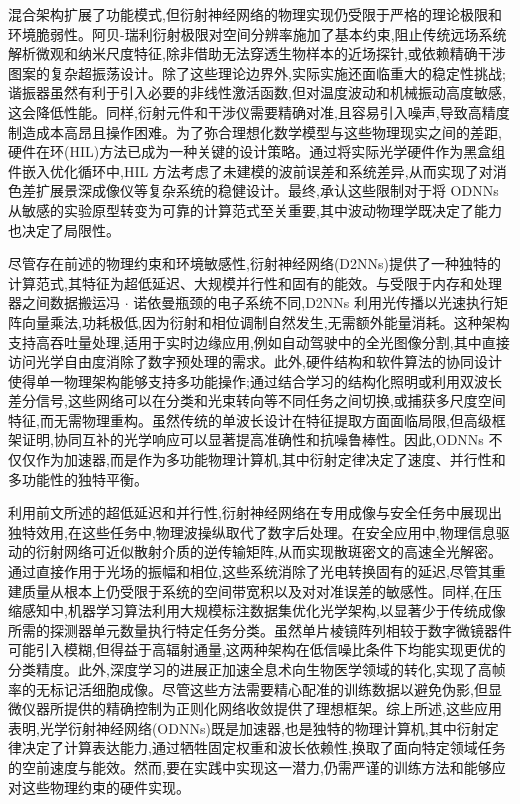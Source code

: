 \documentclass[11pt]{article}
\begin{document}
混合架构扩展了功能模式,但衍射神经网络的物理实现仍受限于严格的理论极限和环境脆弱性。阿贝-瑞利衍射极限对空间分辨率施加了基本约束,阻止传统远场系统解析微观和纳米尺度特征,除非借助无法穿透生物样本的近场探针,或依赖精确干涉图案的复杂超振荡设计。除了这些理论边界外,实际实施还面临重大的稳定性挑战;谐振器虽然有利于引入必要的非线性激活函数,但对温度波动和机械振动高度敏感,这会降低性能。同样,衍射元件和干涉仪需要精确对准,且容易引入噪声,导致高精度制造成本高昂且操作困难。为了弥合理想化数学模型与这些物理现实之间的差距,硬件在环(HIL)方法已成为一种关键的设计策略。通过将实际光学硬件作为黑盒组件嵌入优化循环中,HIL 方法考虑了未建模的波前误差和系统差异,从而实现了对消色差扩展景深成像仪等复杂系统的稳健设计。最终,承认这些限制对于将 ODNNs 从敏感的实验原型转变为可靠的计算范式至关重要,其中波动物理学既决定了能力也决定了局限性。\citep{doi_10_3390_nano14080697_c372a140} \citep{doi_10_1364_oe_461549_b2d41b3f} \citep{doi_10_1117_1_ap_6_5_056004_3f240d06}

尽管存在前述的物理约束和环境敏感性,衍射神经网络(D2NNs)提供了一种独特的计算范式,其特征为超低延迟、大规模并行性和固有的能效。与受限于内存和处理器之间数据搬运冯 \(\cdot\) 诺依曼瓶颈的电子系统不同,D2NNs 利用光传播以光速执行矩阵向量乘法,功耗极低,因为衍射和相位调制自然发生,无需额外能量消耗。这种架构支持高吞吐量处理,适用于实时边缘应用,例如自动驾驶中的全光图像分割,其中直接访问光学自由度消除了数字预处理的需求。此外,硬件结构和软件算法的协同设计使得单一物理架构能够支持多功能操作;通过结合学习的结构化照明或利用双波长差分信号,这些网络可以在分类和光束转向等不同任务之间切换,或捕获多尺度空间特征,而无需物理重构。虽然传统的单波长设计在特征提取方面面临局限,但高级框架证明,协同互补的光学响应可以显著提高准确性和抗噪鲁棒性。因此,ODNNs 不仅仅作为加速器,而是作为多功能物理计算机,其中衍射定律决定了速度、并行性和多功能性的独特平衡。\citep{doi_10_48550_arxiv_2602_07717_16cb1c7a} \citep{doi_10_1364_prj_576203_ae347fba} \citep{doi_10_1038_s41467_022_28702_0_1b79b43c} \citep{doi_10_1002_lpor_202500433_c50e8d3b} \citep{doi_10_1364_oe_598903_731aaac1} \citep{doi_10_1364_ol_591818_8738c4b1}

利用前文所述的超低延迟和并行性,衍射神经网络在专用成像与安全任务中展现出独特效用,在这些任务中,物理波操纵取代了数字后处理。在安全应用中,物理信息驱动的衍射网络可近似散射介质的逆传输矩阵,从而实现散斑密文的高速全光解密。通过直接作用于光场的振幅和相位,这些系统消除了光电转换固有的延迟,尽管其重建质量从根本上仍受限于系统的空间带宽积以及对对准误差的敏感性。同样,在压缩感知中,机器学习算法利用大规模标注数据集优化光学架构,以显著少于传统成像所需的探测器单元数量执行特定任务分类。虽然单片棱镜阵列相较于数字微镜器件可能引入模糊,但得益于高辐射通量,这两种架构在低信噪比条件下均能实现更优的分类精度。此外,深度学习的进展正加速全息术向生物医学领域的转化,实现了高帧率的无标记活细胞成像。尽管这些方法需要精心配准的训练数据以避免伪影,但显微仪器所提供的精确控制为正则化网络收敛提供了理想框架。综上所述,这些应用表明,光学衍射神经网络(ODNNs)既是加速器,也是独特的物理计算机,其中衍射定律决定了计算表达能力,通过牺牲固定权重和波长依赖性,换取了面向特定领域任务的空前速度与能效。然而,要在实践中实现这一潜力,仍需严谨的训练方法和能够应对这些物理约束的硬件实现。\citep{doi_10_1117_1_apn_5_1_016010_3e30c230} \citep{doi_10_1117_1_oe_59_5_051404_363a991a} \citep{doi_10_1038_s41377_019_0196_0_c541a42e}
\end{document}
